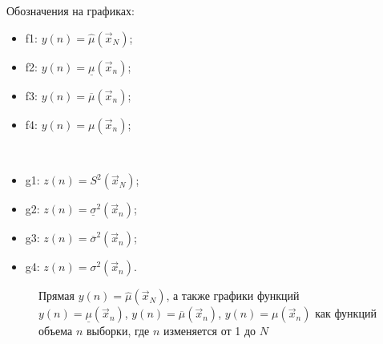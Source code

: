 \documentclass[12pt]{report}
\begin{document}
Обозначения на графиках:

\begin{itemize}
	\item f1: $y(n) = \hat\mu(\vec x_N)$;
	\item f2: $y(n) = \underline\mu(\vec x_n)$;
	\item f3: $y(n) = \overline\mu(\vec x_n)$;
	\item f4: $y(n) = \mu(\vec x_n)$;
\end{itemize}
~\
\begin{itemize}
	\item g1: $z(n) = S^2(\vec x_N)$;
	\item g2: $z(n) = \underline \sigma^2(\vec x_n)$;
	\item g3: $z(n) = \overline \sigma^2(\vec x_n)$;
	\item g4: $z(n) = \sigma^2(\vec x_n)$.
\end{itemize}

\begin{figure}[!h]
	\caption{Прямая $y(n) = \hat\mu(\vec x_N)$, а также графики функций $y(n) = \underline\mu(\vec x_n)$, $y(n) = \overline\mu(\vec x_n)$, $y(n) = \mu(\vec x_n)$ как функций объема $n$ выборки, где $n$ изменяется от 1 до $N$}
\end{figure}
\end{document}
